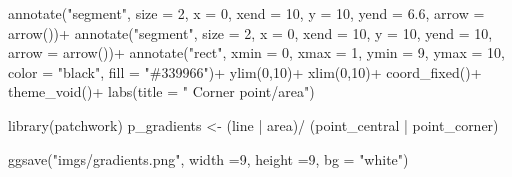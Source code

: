 \documentclass[
  letterpaper,
]{book}
\newenvironment{Shaded}{\begin{snugshade}}{\end{snugshade}}
\newcommand{\AttributeTok}[1]{\textcolor[rgb]{0.40,0.45,0.13}{#1}}
\newcommand{\DecValTok}[1]{\textcolor[rgb]{0.68,0.00,0.00}{#1}}
\newcommand{\FloatTok}[1]{\textcolor[rgb]{0.68,0.00,0.00}{#1}}
\newcommand{\FunctionTok}[1]{\textcolor[rgb]{0.28,0.35,0.67}{#1}}
\newcommand{\NormalTok}[1]{\textcolor[rgb]{0.00,0.23,0.31}{#1}}
\newcommand{\OtherTok}[1]{\textcolor[rgb]{0.00,0.23,0.31}{#1}}
\newcommand{\SpecialCharTok}[1]{\textcolor[rgb]{0.37,0.37,0.37}{#1}}
\newcommand{\StringTok}[1]{\textcolor[rgb]{0.13,0.47,0.30}{#1}}
\begin{document}
\begin{Shaded}
\begin{Highlighting}[]
  \FunctionTok{annotate}\NormalTok{(}\StringTok{"segment"}\NormalTok{, }\AttributeTok{size =} \DecValTok{2}\NormalTok{, }\AttributeTok{x =} \DecValTok{0}\NormalTok{, }\AttributeTok{xend =} \DecValTok{10}\NormalTok{, }\AttributeTok{y =} \DecValTok{10}\NormalTok{, }\AttributeTok{yend =} \FloatTok{6.6}\NormalTok{, }\AttributeTok{arrow =} \FunctionTok{arrow}\NormalTok{())}\SpecialCharTok{+}
  \FunctionTok{annotate}\NormalTok{(}\StringTok{"segment"}\NormalTok{, }\AttributeTok{size =} \DecValTok{2}\NormalTok{, }\AttributeTok{x =} \DecValTok{0}\NormalTok{, }\AttributeTok{xend =} \DecValTok{10}\NormalTok{, }\AttributeTok{y =} \DecValTok{10}\NormalTok{, }\AttributeTok{yend =} \DecValTok{10}\NormalTok{, }\AttributeTok{arrow =} \FunctionTok{arrow}\NormalTok{())}\SpecialCharTok{+}
  \FunctionTok{annotate}\NormalTok{(}\StringTok{"rect"}\NormalTok{, }\AttributeTok{xmin =} \DecValTok{0}\NormalTok{, }\AttributeTok{xmax =} \DecValTok{1}\NormalTok{, }\AttributeTok{ymin =} \DecValTok{9}\NormalTok{, }\AttributeTok{ymax =} \DecValTok{10}\NormalTok{, }\AttributeTok{color =} \StringTok{"black"}\NormalTok{, }\AttributeTok{fill =} \StringTok{"\#339966"}\NormalTok{)}\SpecialCharTok{+}
  \FunctionTok{ylim}\NormalTok{(}\DecValTok{0}\NormalTok{,}\DecValTok{10}\NormalTok{)}\SpecialCharTok{+}
  \FunctionTok{xlim}\NormalTok{(}\DecValTok{0}\NormalTok{,}\DecValTok{10}\NormalTok{)}\SpecialCharTok{+}
  \FunctionTok{coord\_fixed}\NormalTok{()}\SpecialCharTok{+}
  \FunctionTok{theme\_void}\NormalTok{()}\SpecialCharTok{+}
  \FunctionTok{labs}\NormalTok{(}\AttributeTok{title =} \StringTok{"    Corner point/area"}\NormalTok{)}

\FunctionTok{library}\NormalTok{(patchwork)}
\NormalTok{p\_gradients }\OtherTok{\textless{}{-}}\NormalTok{ (line }\SpecialCharTok{|}\NormalTok{ area)}\SpecialCharTok{/}
\NormalTok{(point\_central }\SpecialCharTok{|}\NormalTok{ point\_corner)}

\FunctionTok{ggsave}\NormalTok{(}\StringTok{"imgs/gradients.png"}\NormalTok{, }\AttributeTok{width =}\DecValTok{9}\NormalTok{, }\AttributeTok{height =}\DecValTok{9}\NormalTok{, }\AttributeTok{bg =} \StringTok{"white"}\NormalTok{)}
\end{Highlighting}
\end{Shaded}
\end{document}
